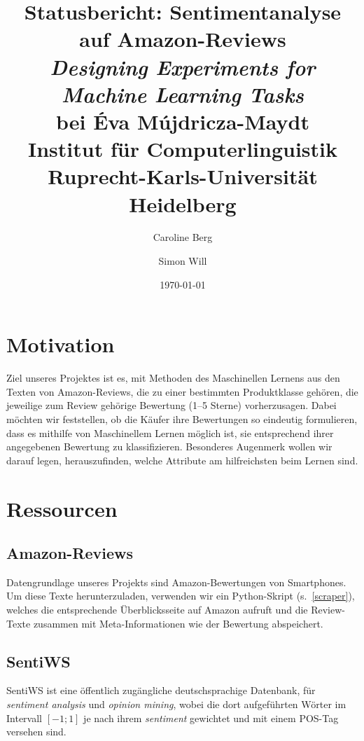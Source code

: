 \documentclass[a4paper]{article}
\title{Statusbericht: Sentimentanalyse auf Amazon-Reviews\\[0.5cm]
\large \textit{Designing Experiments for Machine Learning Tasks}\\[0.2cm]
\large bei Éva Mújdricza-Maydt\\[0.2cm]
\large Institut für Computerlinguistik\\[0.2cm]
\large Ruprecht-Karls-Universität Heidelberg\\}
\author{Caroline Berg \and Simon Will}
\date{\today}
\newcommand{\ourhighlight}[1]{\textit{#1}}
\begin{document}
\maketitle


\section{Motivation}

Ziel unseres Projektes ist es, mit Methoden des Maschinellen Lernens aus den Texten von Amazon-Reviews, die zu einer bestimmten Produktklasse gehören, die jeweilige zum Review gehörige Bewertung (1--5 Sterne) vorherzusagen.
Dabei möchten wir feststellen, ob die Käufer ihre Bewertungen so eindeutig formulieren, dass es mithilfe von Maschinellem Lernen möglich ist, sie entsprechend ihrer angegebenen Bewertung zu klassifizieren.
Besonderes Augenmerk wollen wir darauf legen, herauszufinden, welche Attribute am hilfreichsten beim Lernen sind.


\section{Ressourcen}




\subsection{Amazon-Reviews}
Datengrundlage unseres Projekts sind Amazon-Bewertungen von Smartphones.
Um diese Texte herunterzuladen, verwenden wir ein Python-Skript (s.~\ref{scraper}), welches die entsprechende Überblicksseite auf Amazon aufruft und die Review-Texte zusammen mit Meta-Informationen wie der Bewertung abspeichert. 



\subsection{SentiWS}
SentiWS ist eine öffentlich zugängliche deutschsprachige Datenbank, für \ourhighlight{sentiment analysis} und \ourhighlight{opinion mining}, wobei die dort aufgeführten Wörter im Intervall $[-1;1]$ je nach ihrem \ourhighlight{sentiment} gewichtet und mit einem POS-Tag versehen sind. \autocite[vgl. S.~1168]{sentiws} 
\end{document}
